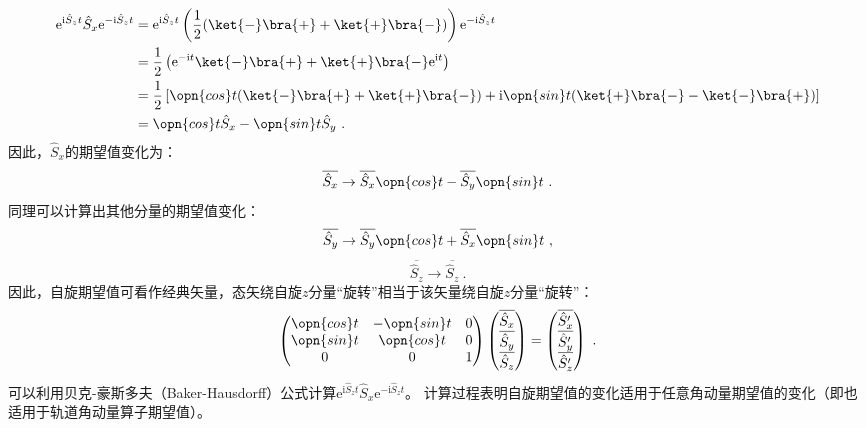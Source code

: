 \begin{equation}
\begin{aligned}
\mathrm e^{\mathrm i \hat S_zt}\hat S_x\mathrm e^{-\mathrm i \hat S_zt}&=\mathrm e^{\mathrm i \hat S_zt}\left(\frac{1}{2}(\ket{-}\bra{+}+\ket{+}\bra{-})\right)\mathrm e^{-\mathrm i \hat S_zt}\\
 &=\frac{1}{2}\left(\mathrm e^{-\mathrm i t}\ket{-}\bra{+}+\ket{+}\bra{-}\mathrm e^{\mathrm i t}\right)\\
 &=\frac{1}{2}\left[\opn{cos}t(\ket{-}\bra{+}+\ket{+}\bra{-})+\mathrm i\opn{sin}t(\ket{+}\bra{-}-\ket{-}\bra{+})\right]\\
 &=\opn{cos}t \hat S_x-\opn{sin}t \hat S_y~.
\end{aligned}
\end{equation}
因此，$\hat S_x$的期望值变化为：
\begin{equation}
\overline{\hat S_x}\rightarrow  \overline{\hat S_x}\opn{cos}t-\overline{\hat S_y}\opn{sin}t~.
\end{equation}
同理可以计算出其他分量的期望值变化：
\begin{equation}
\overline{\hat S_y}\rightarrow \overline{\hat S_y}\opn{cos}t+\overline{\hat S_x}\opn{sin}t~,
\end{equation}
\begin{equation}
\overline{\hat S_z}\rightarrow \overline{\hat S_z}~.
\end{equation}
因此，自旋期望值可看作经典矢量，态矢绕自旋$z$分量“旋转”相当于该矢量绕自旋$z$分量“旋转”：
\begin{equation}
\begin{pmatrix}
 \opn{cos}t &-\opn{sin}t  &0 \\
  \opn{sin}t & \opn{cos}t  & 0\\
  0& 0 &1
\end{pmatrix}
\begin{pmatrix}
 \overline{\hat S_x}\\
  \overline{\hat S_y}\\
 \overline{\hat S_z}
\end{pmatrix}
=
\begin{pmatrix}
  \overline{\hat S'_x}\\
  \overline{\hat S'_y}\\
 \overline{\hat S'_z}
\end{pmatrix}~.
\end{equation}
可以利用贝克-豪斯多夫（Baker-Hausdorff）公式计算$\mathrm e^{\mathrm i \hat S_zt}\hat S_x\mathrm e^{-\mathrm i \hat S_zt}$。
计算过程表明自旋期望值的变化适用于任意角动量期望值的变化（即也适用于轨道角动量算子期望值）。



